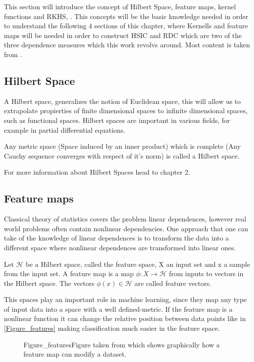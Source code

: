 This section will introduce the concept of Hilbert Space, feature maps, kernel functions and RKHS, . This concepts will be the basic knowledge needed in order to understand the following 4 sections of this chapter, where Kernells and feature maps will be needed in order to construct HSIC and RDC which are two of the three dependence measures which this work revolvs around. Most content is taken from \cite{Feature_maps}.
\subsection{Hilbert Space}
A Hilbert space, generalizes the notion of Euclidean space, this will allow us to extrapolate propierties of finite dimensional spaces to infinite dimensional spaces, such as functional spaces. Hilbert spaces are important in various fields, for example in partial differential equations.
\begin{defn}
Any metric space (Space induced by an inner product) which is complete (Any Cauchy sequence converges with respect of it's norm) is called a Hilbert space.
\end{defn}
For more information about Hilbert Spaces head to \cite{RKHS_libro} chapter 2.
\subsection{Feature maps }
Classical theory of statistics covers the problem linear dependences, however real world problems often contain nonlinear dependencies. One approach that one can take of the knowledge of linear dependences is to transform the data into a different space where nonlinear dependences are transformed into linear ones.  
\begin{defn}
Let $\mathcal{H}$ be a Hilbert space, called the feature space, X an input set and x a sample from the input set. A feature map is a map $\phi:X\rightarrow\mathcal{H}$ from inputs to vectors in the Hilbert space. The vectors $\phi(x)\in\mathcal{H}$ are called feature vectors.
\end{defn}
This spaces play an important role in machine learning, since they map any type of input data into a space with a well defined-metric.  
If the feature map is a nonlinear function it can change the relative position between data points like in \ref{Figure_features} making classification much easier in the feature space.
\begin{figure}[Example of how a feature map can modify a dataset]{Figure_features}{Figure taken from \cite{Figure_feature} which shows graphically how a feature map can modify a dataset.}
\end{figure}

